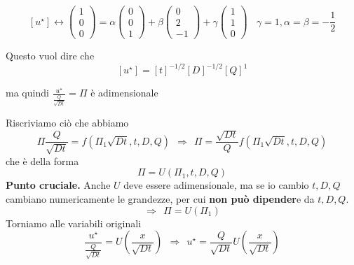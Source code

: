 \begin{itemize}
          \begin{equation*}
              \left[ u^{\star }\right] \leftrightarrow \begin{pmatrix}
                  1 \\
                  0 \\
                  0
              \end{pmatrix} =\alpha \begin{pmatrix}
                  0 \\
                  0 \\
                  1
              \end{pmatrix} +\beta \begin{pmatrix}
                  0 \\
                  2 \\
                  -1
              \end{pmatrix} +\gamma \begin{pmatrix}
                  1 \\
                  1 \\
                  0
              \end{pmatrix} \ \ \ \ \gamma =1,\alpha =\beta =-\frac{1}{2}
          \end{equation*}

          Questo vuol dire che
          \begin{equation*}
              \left[ u^{\star }\right] =[ t]^{-1/2}[ D]^{-1/2}[ Q]^{1}
          \end{equation*}

          ma quindi $\frac{u^{\star }}{\frac{Q}{\sqrt{Dt}}} =\Pi $ è adimensionale
\end{itemize}

Riscriviamo ciò che abbiamo
\begin{equation*}
    \Pi \frac{Q}{\sqrt{Dt}} =f\left(\Pi _{1}\sqrt{Dt},t,D,Q\right) \ \ \Rightarrow \ \ \Pi =\frac{\sqrt{Dt}}{Q} f\left(\Pi _{1}\sqrt{Dt},t,D,Q\right)
\end{equation*}
che è della forma
\begin{equation*}
    \Pi =U(\Pi _{1},t,D,Q)
\end{equation*}
\textbf{Punto cruciale.} Anche $U$ deve essere adimensionale, ma se io cambio $t,D,Q$ cambiano numericamente le grandezze, per cui \textbf{non può dipender}e da $t,D,Q$.
\begin{equation*}
    \Rightarrow \ \ \Pi =U(\Pi _{1})
\end{equation*}
Torniamo alle variabili originali
\begin{equation*}
    \frac{u^{\star }}{\frac{Q}{\sqrt{Dt}}} =U\left(\frac{x}{\sqrt{Dt}}\right) \ \ \Rightarrow \ \ u^{\star } =\frac{Q}{\sqrt{Dt}} U\left(\frac{x}{\sqrt{Dt}}\right)
\end{equation*}
